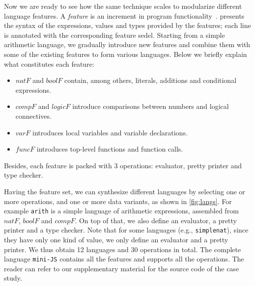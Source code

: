 Now we are ready to see how the same technique scales to modularize different
language features. A \emph{feature} is an increment in program
functionality~\cite{zave1999faq,lopez2005evaluating}. 
presents the syntax of the expressions, values and types provided by the
features; each line is annotated with the corresponding feature sedel. Starting from a
simple arithmetic language, we gradually introduce new features and combine them
with some of the existing features to form various languages. Below we briefly
explain what constitutes each feature:
\begin{itemize}
\item $\mathit{natF}$ and $\mathit{boolF}$ contain, among others, literals, additions and conditional expressions.
\item $\mathit{compF}$ and $\mathit{logicF}$ introduce comparisons between numbers and logical connectives.
\item $\mathit{varF}$ introduces local variables and variable declarations.
\item $\mathit{funcF}$ introduces top-level functions and function calls.
\end{itemize}
Besides, each feature is packed with 3 operations: evaluator, pretty
printer and type checker.

Having the feature set, we can synthesize different languages by selecting one
or more operations, and one or more data variants, as shown in \cref{fig:langs}.
For example \lstinline{arith} is a simple language of arithmetic expressions,
assembled from $\mathit{natF}$, $\mathit{boolF}$ and $\mathit{compF}$. On top of
that, we also define an evaluator, a pretty printer and a type checker. Note
that for some languages (e.g., \lstinline{simplenat}), since they have only one
kind of value, we only define an evaluator and a pretty printer. We thus obtain
12 languages and 30 operations in total. The complete language
\lstinline{mini-JS} contains all the features and supports all the operations. %
The reader can refer to our supplementary material for the source code of the case study.


